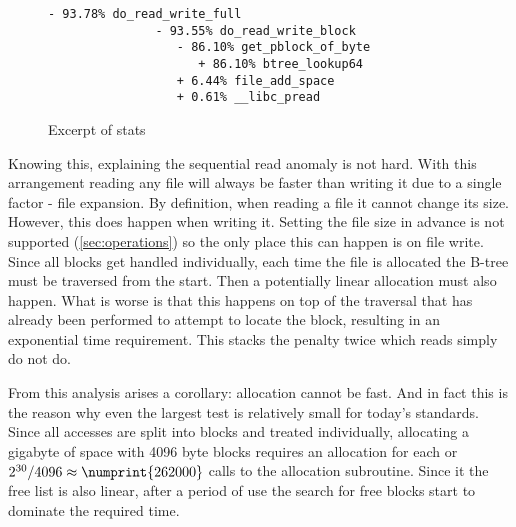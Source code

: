         \begin{wrapfigure}[8]{r}{0.45\textwidth}
            \vspace{-20pt}
            \begin{lstlisting}[gobble=12]
            - 93.78% do_read_write_full
               - 93.55% do_read_write_block
                  - 86.10% get_pblock_of_byte
                     + 86.10% btree_lookup64
                  + 6.44% file_add_space
                  + 0.61% __libc_pread
            \end{lstlisting}
            \caption{Excerpt of  stats}
            \label{fig:perf_sample}
        \end{wrapfigure}

        Knowing this, explaining the sequential read anomaly is not hard. With
        this arrangement reading any file will always be faster than writing it
        due to a single factor - file expansion. By definition, when reading a
        file it cannot change its size. However, this does happen when writing
        it. Setting the file size in advance is not supported
        (\autoref{sec:operations}) so the only place this can happen is on file
        write. Since all blocks get handled individually, each time the file is
        allocated the B-tree must be traversed from the start. Then a
        potentially linear allocation must also happen. What is worse is that
        this happens on top of the traversal that has already been performed to
        attempt to locate the block, resulting in an exponential time
        requirement. This stacks the penalty twice which reads simply do not
        do.

        From this analysis arises a corollary: allocation cannot be fast. And
        in fact this is the reason why even the largest test is relatively
        small for today's standards. Since all accesses are split into blocks
        and treated individually, allocating a gigabyte of space with 4096 byte
        blocks requires an allocation for each or $2^{30} / 4096 \approx
        \numprint{262000}$ calls to the allocation subroutine. Since it the
        free list is also linear, after a period of use the search for free
        blocks start to dominate the required time.



